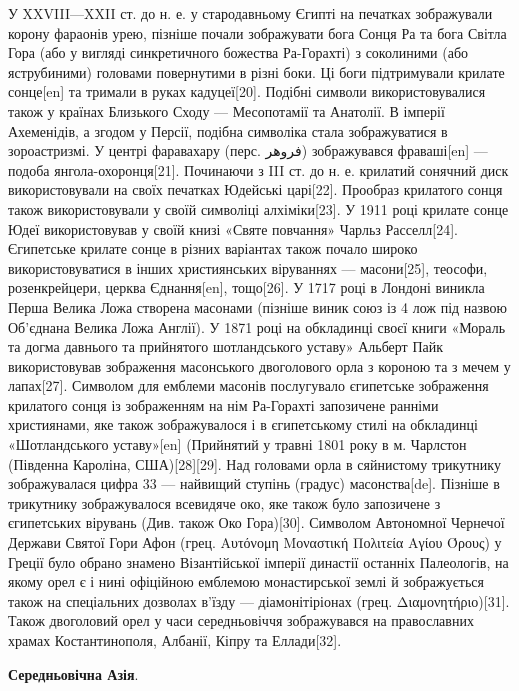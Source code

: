\begin{multicols}{2}
У XXVIII—XXII ст. до н. е. у стародавньому Єгипті на печатках зображували
корону фараонів урею, пізніше почали зображувати бога Сонця Ра та бога Світла
Гора (або у вигляді синкретичного божества Ра-Горахті) з соколиними (або
яструбиними) головами повернутими в різні боки. Ці боги підтримували крилате
сонце[en] та тримали в руках кадуцеї[20]. Подібні символи використовувалися
також у країнах Близького Сходу — Месопотамії та Анатолії. В імперії
Ахеменідів, а згодом у Персії, подібна символіка стала зображуватися в
зороастризмі. У центрі фаравахару (перс. فروهر) зображувався фраваші[en] —
подоба янгола-охоронця[21]. Починаючи з III ст. до н. е. крилатий сонячний диск
використовували на своїх печатках Юдейські царі[22]. Прообраз крилатого сонця
також використовували у своїй символіці алхіміки[23]. У 1911 році крилате сонце
Юдеї використовував у своїй книзі «Святе повчання» Чарльз Расселл[24].
Єгипетське крилате сонце в різних варіантах також почало широко
використовуватися в інших християнських віруваннях — масони[25], теософи,
розенкрейцери, церква Єднання[en], тощо[26]. У 1717 році в Лондоні виникла
Перша Велика Ложа створена масонами (пізніше виник союз із 4 лож під назвою
Об'єднана Велика Ложа Англії). У 1871 році на обкладинці своєї книги «Мораль та
догма давнього та прийнятого шотландського уставу» Альберт Пайк використовував
зображення масонського двоголового орла з короною та з мечем у лапах[27].
Символом для емблеми масонів послугувало єгипетське зображення крилатого сонця
із зображенням на нім Ра-Горахті запозичене ранніми християнами, яке також
зображувалося і в єгипетському стилі на обкладинці «Шотландського уставу»[en]
(Прийнятий у травні 1801 року в м. Чарлстон (Південна Кароліна, США)[28][29].
Над головами орла в сяйнистому трикутнику зображувалася цифра 33 — найвищий
ступінь (градус) масонства[de]. Пізніше в трикутнику зображувалося всевидяче
око, яке також було запозичене з єгипетських вірувань (Див. також Око
Гора)[30]. Символом Автономної Чернечої Держави Святої Гори Афон (грец.
Αυτόνομη Μοναστική Πολιτεία Αγίου Όρους) у Греції було обрано знамено
Візантійської імперії династії останніх Палеологів, на якому орел є і нині
офіційною емблемою монастирської землі й зображується також на спеціальних
дозволах в'їзду — діамонітіріонах (грец. Διαμονητήριο)[31]. Також двоголовий
орел у часи середньовіччя зображувався на православних храмах Костантинополя,
Албанії, Кіпру та Еллади[32]. 

\textbf{Середньовічна Азія}.


\end{multicols}

